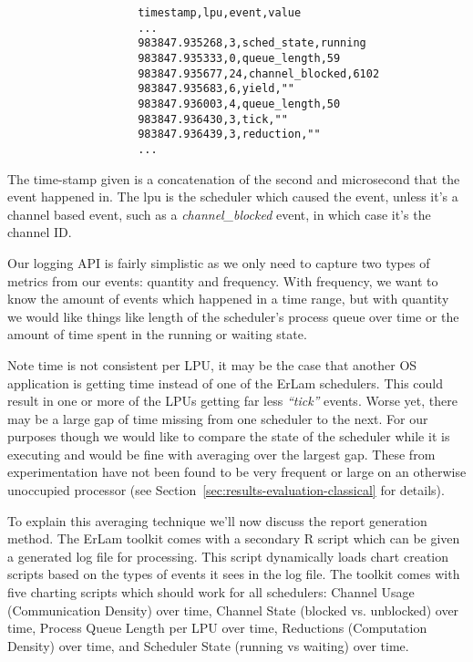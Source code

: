 {\footnotesize
\begin{verbatim}
                    timestamp,lpu,event,value
                    ...
                    983847.935268,3,sched_state,running
                    983847.935333,0,queue_length,59
                    983847.935677,24,channel_blocked,6102
                    983847.935683,6,yield,""
                    983847.936003,4,queue_length,50
                    983847.936430,3,tick,""
                    983847.936439,3,reduction,""
                    ...
\end{verbatim}
}
\noindent
The time-stamp given is a concatenation of the second and microsecond that the
event happened in. The lpu is the scheduler which caused the event, unless it's
a channel based event, such as a \emph{channel\_blocked} event, in which case it's
the channel ID. 

Our logging API is fairly simplistic as we only need to capture two types of metrics
from our events: quantity and frequency. With frequency, we want to know the
amount of events which happened in a time range, but with quantity we would like 
things like length of the scheduler's process queue over time or the amount of
time spent in the running or waiting state.

Note time is not consistent per LPU, it may be the case that another OS 
application is getting time instead of one of the ErLam schedulers. This could
result in one or more of the LPUs getting far less \emph{``tick''} events. Worse
yet, there may be a large gap of time missing from one scheduler to the next.
For our purposes though we would like to compare the state of the scheduler
while it is executing and would be fine with averaging over the largest gap. These
from experimentation have not been found to be very frequent or large on an
otherwise unoccupied processor (see Section~\ref{sec:results-evaluation-classical} 
for details).

To explain this averaging technique we'll now discuss the report generation 
method. The ErLam toolkit comes with a secondary R script which can be given a 
generated log file for processing. This script dynamically loads chart 
creation scripts based on the types of events it sees in the log file. The
toolkit comes with five charting scripts which should work for all schedulers: 
Channel Usage (Communication Density) over time,
Channel State (blocked vs. unblocked) over time,
Process Queue Length per LPU over time,
Reductions (Computation Density) over time, and
Scheduler State (running vs waiting) over time.

